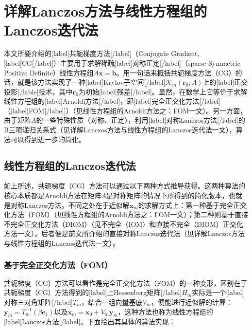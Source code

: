 \documentclass[UTF8,nofonts]{ctexart}
\begin{document}

\section*{详解Lanczos方法与线性方程组的Lanczos迭代法}


本文所要介绍的[label]共轭梯度方法[/label]（Conjugate Gradient, [label]CG[/label]）主要用于求解稀疏[label]对称正定[/label]（sparse Symmetric Positive Definite）线性方程组$A\boldsymbol{x}=\boldsymbol{b}$。用一句话来概括共轭梯度方法（CG）的话，就是该方法实现了一种[label]Krylov子空间[/label]$\mathcal{K}_m(\boldsymbol{r}_0,A)$上的[label]正交投影[/lable]技术，其中$\boldsymbol{r}_0$为初始[label]残差[/label]。显然，在数学上它等价于求解线性方程组的[label]Arnoldi方法[/label]，即[label]完全正交化方法[/label]（[label]FOM[/label]）（见线性方程组的Arnoldi方法之：FOM一文）。另一方面，由于矩阵$A$的一些特殊性质（对称、正定），利用[label]对称Lanczos方法[/label]的B三项递归关系式（见详解Lanczos方法与线性方程组的Lanczos迭代法一文），算法可以得到进一步的简化。

\subsection*{线性方程组的Lanczos迭代法}

如上所述，共轭梯度（CG）方法可以通过以下两种方式推导获得。这两种算法的核心本质都是Arnoldi方法在矩阵$A$是对称矩阵的情况下所得到的简化版本，也就是对称Lanczos方法。不同之处在于近似解$\boldsymbol{x}_m$的求解方式上：第一种基于完全正交化方法（FOM）（见线性方程组的Arnoldi方法之：FOM一文）；第二种则基于直接不完全正交化方法（DIOM）（见不完全（IOM）和直接不完全（DIOM）正交化方法一文）。后者便是前文所介绍的直接对称Lanczos迭代法（见详解Lanczos方法与线性方程组的Lanczos迭代法一文）。

\subsubsection*{基于完全正交化方法（FOM）}

共轭梯度（CG）方法可以看作是完全正交化方法（FOM）的一种变形，区别在于共轭梯度（CG）方法得到的[label]上Hessenberg矩阵[/label]$H_m$实际是一个[label]对称三对角矩阵[/label]$T_m$，结合一组向量基底$V_m$，便能进行近似解的计算：$\boldsymbol{y}_m=T^{-1}_m(\beta\boldsymbol{e}_1)$以及$\boldsymbol{x}_m=\boldsymbol{x}_0+V_m\boldsymbol{y}_m$，这种方法也称为线性方程组的[label]Lanczos方法[/label]。下面给出其具体的算法实现：
\end{document}
